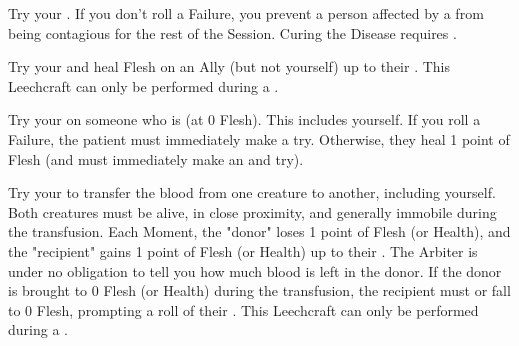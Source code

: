   \LEECHCRAFT[
    Name=Quarantine,
    Link=leechcraft-quarantine
  ]
  
  Try your \INGENUITY. If you don't roll a Failure, you prevent a person affected by a  from being contagious for the rest of the Session. Curing the Disease requires .

  \LEECHCRAFT[
    Name=Sew Wounds,
    Link=leechcraft-sew-wounds
  ]

  Try your \INGENUITY and heal \SUMDICE Flesh on an Ally (but not yourself) up to their \MAX. This Leechcraft can only be performed during a .

  \LEECHCRAFT[
    Name=Stitch,
    Link=leechcraft-stitch
  ]
   
  Try your \INGENUITY on someone who is  (at 0 Flesh). This includes yourself. If you roll a Failure, the patient must immediately make a \DEATH try. Otherwise, they heal 1 point of Flesh (and must immediately make an \INSANITY and \INJURY try). 


\cbreak

  \LEECHCRAFT[
    Name=Transfusion,
    Link=leechcraft-transfusion
  ]

  Try your \INGENUITY to transfer the blood from one creature to another, including yourself. Both creatures must be alive, in close proximity, and generally immobile during the transfusion. Each Moment, the "donor" loses 1 point of Flesh (or Health), and the "recipient" gains 1 point of Flesh (or Health) up to their \MAX. The Arbiter is under no obligation to tell you how much blood is left in the donor. If the donor is brought to 0 Flesh (or Health) during the transfusion, the recipient must  or fall to 0 Flesh, prompting a roll of their \DEATH. This Leechcraft can only be performed during a . 
